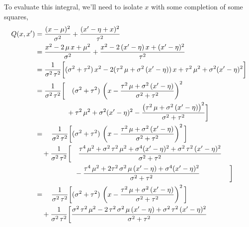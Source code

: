 \documentclass[11pt, oneside]{article}
\begin{document}
To evaluate this integral, we'll need to isolate $x$ with some 
completion of some squares,
%
\begin{align*}
Q(x, x') 
&= 
  \frac{ ( x - \mu )^{2} }{ \sigma^{2} }
+ \frac{ ( x' - \eta + x )^{2} }{ \tau^{2} }
\\
&=
  \frac{ x^{2} - 2 \, \mu \, x + \mu^{2} }{ \sigma^{2} }
+ \frac{ x^{2} - 2 \, (x' - \eta) \, x + (x' - \eta)^{2} }{ \tau^{2} }
\\
&=
\frac{1}{ \sigma^{2} \, \tau^{2} } \bigg[
    ( \sigma^{2} + \tau^{2} ) \, x^{2}
  - 2 ( \tau^{2} \, \mu + \sigma^{2} \, (x' - \eta) ) \, x
  + \tau^{2} \, \mu^{2} + \sigma^{2} ( x' - \eta)^{2}
\bigg]
\\
&=
\frac{1}{ \sigma^{2} \, \tau^{2} } \bigg[ \quad
    ( \sigma^{2} + \tau^{2} ) \, \left( 
      x - \frac{  \tau^{2} \, \mu + \sigma^{2} \, (x' - \eta) }{ \sigma^{2} + \tau^{2} } 
    \right)^{2}
\\
&\hspace{16mm}
  + \tau^{2} \, \mu^{2} + \sigma^{2} ( x' - \eta)^{2}
  - \frac{ 
      \left( \tau^{2} \, \mu + \sigma^{2} \, (x' - \eta) \right)^{2}
    }{
      \sigma^{2} + \tau^{2} 
    }
\bigg]
\\
&=\quad
\frac{1}{ \sigma^{2} \, \tau^{2} } \bigg[
    ( \sigma^{2} + \tau^{2} ) \, \left( 
      x - \frac{  \tau^{2} \, \mu + \sigma^{2} \, (x' - \eta) }{ \sigma^{2} + \tau^{2} } 
    \right)^{2}
\bigg]
\\
&\quad+
\frac{1}{ \sigma^{2} \, \tau^{2} } \bigg[ \quad
    \frac{ 
       \tau^{4} \, \mu^{2} 
     + \sigma^{2} \, \tau^{2} \, \mu^{2} 
     + \sigma^{4} ( x' - \eta)^{2}
     + \sigma^{2} \, \tau^{2} \, ( x' - \eta)^{2}
    }{
      \sigma^{2} + \tau^{2} 
    }
\\
&\hspace{20mm}
  - \frac{ 
       \tau^{4} \, \mu^{2} 
     + 2 \tau^{2} \, \sigma^{2} \, \mu \, (x' - \eta)
     + \sigma^{4} (x' - \eta)^{2}
    }{
      \sigma^{2} + \tau^{2} 
    }
\hspace{15mm} \bigg]
\\
&=\quad
\frac{1}{ \sigma^{2} \, \tau^{2} } \bigg[
    ( \sigma^{2} + \tau^{2} ) \, \left( 
      x - \frac{  \tau^{2} \, \mu + \sigma^{2} \, (x' - \eta) }{ \sigma^{2} + \tau^{2} } 
    \right)^{2}
\bigg]
\\
&\quad+
\frac{1}{ \sigma^{2} \, \tau^{2} } \bigg[
    \frac{ 
       \sigma^{2} \, \tau^{2} \, \mu^{2} 
     - 2 \, \tau^{2} \, \sigma^{2} \, \mu \, (x' - \eta)
     + \sigma^{2} \, \tau^{2} \, ( x' - \eta)^{2}
    }{
      \sigma^{2} + \tau^{2} 
}
\end{align*}
\end{document}
